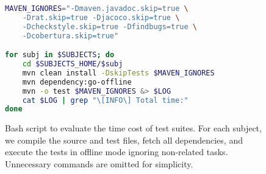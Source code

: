 \begin{figure}[h!]
\centering
\scriptsize
{}
\begin{lstlisting}[language=Bash]
MAVEN_IGNORES="-Dmaven.javadoc.skip=true \
    -Drat.skip=true -Djacoco.skip=true \
    -Dcheckstyle.skip=true -Dfindbugs=true \
    -Dcobertura.skip=true"

for subj in $SUBJECTS; do
    cd $SUBJECTS_HOME/$subj
    mvn clean install -DskipTests $MAVEN_IGNORES
    mvn dependency:go-offline
    mvn -o test $MAVEN_IGNORES &> $LOG
    cat $LOG | grep "\[INFO\] Total time:"
done
\end{lstlisting}
\caption{\label{fig:mvn-execution} Bash script to evaluate the time cost of
    test suites. For each subject, we compile the source and test files, fetch
    all dependencies, and execute the tests in offline mode ignoring
    non-related tasks. Unnecessary commands are omitted for simplicity.}
\end{figure}
